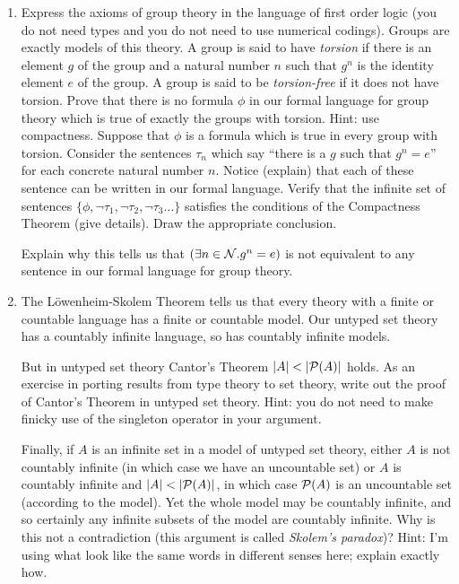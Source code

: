 \documentclass[12pt]{book}
\begin{document}
\begin{enumerate}

\item 
Express the axioms of group theory in the language of first order
logic (you do not need types and you do not need to use numerical
codings).  Groups are exactly models of this theory.  A group is
said to have {\em torsion\/} if there is an element $g$ of the group
and a natural number $n$ such that $g^n$ is the identity element $e$
of the group.  A group is said to be {\em torsion-free} if it does not
have torsion.  Prove that there is no formula $\phi$ in our formal
language for group theory which is true of exactly the groups with
torsion.  Hint: use compactness.  Suppose that $\phi$ is a formula
which is true in every group with torsion.  Consider the sentences
$\tau_n$ which say ``there is a $g$ such that $g^n=e$'' for each
concrete natural number $n$.  Notice (explain) that each of these
sentence can be written in our formal language.  Verify that the
infinite set of sentences $\{\phi,\neg\tau_1,\neg\tau_2,\neg\tau_3
\ldots\}$ satisfies the conditions of the Compactness Theorem (give
details).  Draw the appropriate conclusion.

Explain why this tells us that $(\exists n \in {\cal N}.g^n=e)$ is not
equivalent to any sentence in our formal language for group theory.

\item
The L\"owenheim-Skolem Theorem tells us that every theory with a
finite or countable language has a finite or countable model.  Our
untyped set theory has a countably infinite language, so has countably
infinite models.  

But in untyped set theory Cantor's Theorem $|A| < |{\cal P}(A)|$
holds.  As an exercise in porting results from type theory to set
theory, write out the proof of Cantor's Theorem in untyped set theory.
Hint: you do not need to make finicky use of the singleton operator in
your argument.

Finally, if $A$ is an infinite set in a model of untyped set theory,
either $A$ is not countably infinite (in which case we have an
uncountable set) or $A$ is countably infinite and $|A| < |{\cal
P}(A)|$, in which case ${\cal P}(A)$ is an uncountable set (according
to the model).  Yet the whole model may be countably infinite, and so
certainly any infinite subsets of the model are countably infinite.
Why is this not a contradiction (this argument is called {\em Skolem's
paradox\/})?  Hint: I'm using what look like the same words in
different senses here; explain exactly how.

\end{enumerate}
\end{document}
